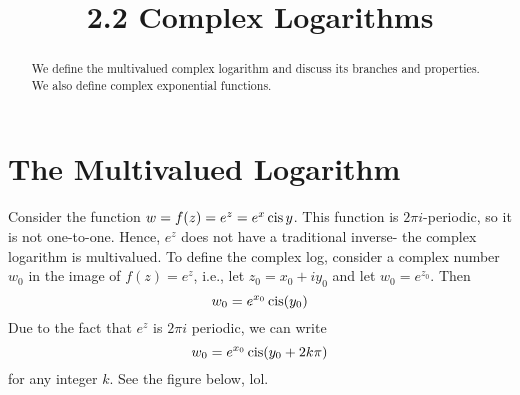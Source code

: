 \documentclass[handout]{ximera}
\title{2.2 Complex Logarithms}
\begin{document}
\begin{abstract}
    We define the multivalued complex logarithm and discuss its branches and properties. We also define complex exponential functions.
\end{abstract}
\maketitle


\section{The Multivalued Logarithm}
Consider the function $w = f(z) = e^z = e^x \operatorname{cis} y$. This function is $2\pi i$-periodic, so it is not one-to-one.  Hence, $e^z$ does not have a traditional inverse-
the complex logarithm is multivalued.  
To define the complex log, consider a complex number $w_0$ in the image of $f(z) = e^z$, i.e.,
let $z_0 = x_0 + iy_0$ and let $w_0 = e^{z_0}$. Then
\[
w_0 = e^{x_0} \operatorname{cis} (y_0)
\]
Due to the fact that $e^z$ is $2\pi i$ periodic, we can write
\[
w_0 = e^{x_0} \operatorname{cis} (y_0+2k\pi)
\]
for any integer $k$. See the figure below, lol.

\begin{center}
\end{center}
\end{document}
